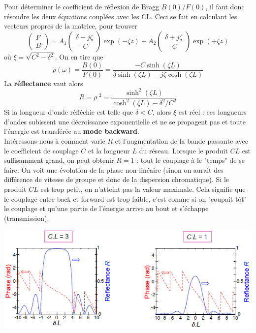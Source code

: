 Pour déterminer le coefficient de réflexion de Bragg $B(0)/F(0)$, il faut donc résoudre les deux
équations couplées avec les CL. Ceci se fait en calculant les vecteurs propres de la matrice, pour
trouver
\begin{equation}
\left( {\begin{array}{*{20}{c}}
F\\
B
\end{array}} \right) = {A_1}\left( {\begin{array}{*{20}{c}}
{\delta  - j\zeta }\\
{ - \;C}
\end{array}} \right)\exp ( - \zeta z) + {A_2}\left( {\begin{array}{*{20}{c}}
{\delta  + j\zeta }\\
{ - \;C}
\end{array}} \right)\exp ( + \zeta z)
\end{equation}
où $\xi = \sqrt{C^2-\delta^2}$. On en tire que
\begin{equation}
\rho (\omega ) = \frac{{B(0)}}{{F(0)}} = \frac{{ - C\sinh (\zeta L)}}{{\delta \sinh (\zeta L) - j\zeta \cosh (\zeta L)}}
\end{equation}
La \textbf{réflectance} vaut alors
\begin{equation}
R = \rho \;{^2} = \frac{{{{\sinh }^2}(\zeta L)}}{{{{\cosh }^2}(\zeta L) - {\delta ^2}/{C^2}}}
\end{equation}
Si la longueur d'onde réfléchie est telle que $\delta < C$, alors $\xi$ est réel : ces longueurs
d'ondes subissent une décroissance exponentielle et ne se propagent pas et toute l'énergie est
transférée au \textbf{mode backward}.\\

Intéressons-nous à comment varie $R$ et l'augmentation de la bande passante avec le coefficient de 
couplage $C$ et la longueur $L$ du réseau. Lorsque le produit $CL$ est suffisamment grand, on peut
obtenir $R=1$ : tout le couplage à le "temps" de se faire. On voit une évolution de la phase 
non-linéaire (sinon on aurait des différence de vitesse de groupe et donc de la dispersion 
chromatique). Si le produit $CL$ est trop petit, on n'atteint pas la valeur maximale. Cela signifie
que le couplage entre back et forward est trop faible, c'est comme si on "coupait tôt" le couplage
et qu'une partie de l'énergie arrive au bout et s'échappe (transmission).

\begin{center}
	\includegraphics[scale=0.8]{ch3/image12}
\end{center}

